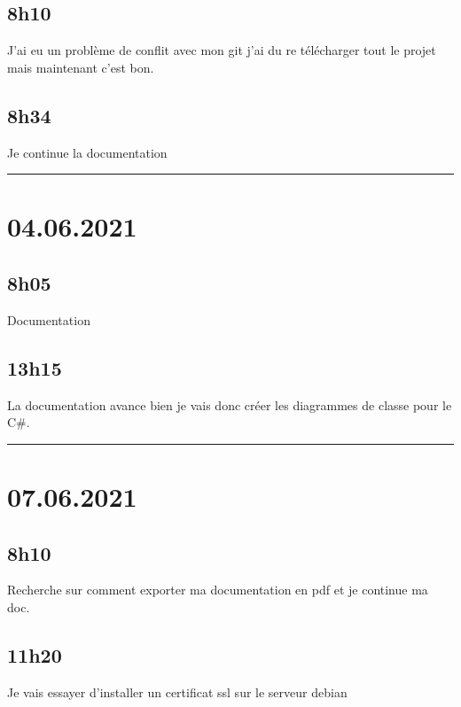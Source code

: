 \documentclass[a4paper,12pt,french]{sphinxmanual}
\begin{document}
\subsection{8h10}
\label{\detokenize{logbook:id187}}
\sphinxAtStartPar
J’ai eu un problème de conflit avec mon git j’ai du re télécharger tout le projet mais maintenant c’est bon.


\subsection{8h34}
\label{\detokenize{logbook:h34}}
\sphinxAtStartPar
Je continue la documentation


\bigskip\hrule\bigskip



\section{04.06.2021}
\label{\detokenize{logbook:id188}}

\subsection{8h05}
\label{\detokenize{logbook:id189}}
\sphinxAtStartPar
Documentation


\subsection{13h15}
\label{\detokenize{logbook:id190}}
\sphinxAtStartPar
La documentation avance bien je vais donc créer les diagrammes de classe pour le C\#.


\bigskip\hrule\bigskip



\section{07.06.2021}
\label{\detokenize{logbook:id191}}

\subsection{8h10}
\label{\detokenize{logbook:id192}}
\sphinxAtStartPar
Recherche sur comment exporter ma documentation en pdf et je continue ma doc.


\subsection{11h20}
\label{\detokenize{logbook:id193}}
\sphinxAtStartPar
Je vais essayer d’installer un certificat ssl sur le serveur debian
\end{document}
